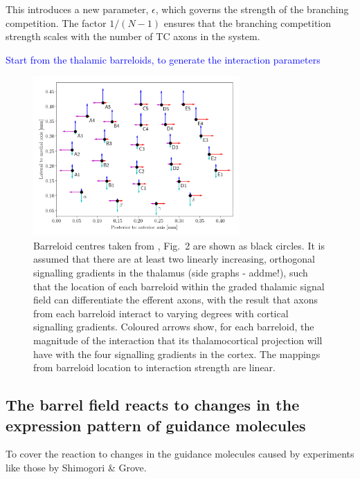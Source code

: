 \documentclass[a4paper,11pt]{article}
\newcommand{\cmnt}[1]{\textcolor{blue}{#1}}
\begin{document}
This introduces a new parameter, $\epsilon$, which governs the
strength of the branching competition. The factor $1/(N-1)$ ensures that the
branching competition strength scales with the number of TC axons in the
system.

\cmnt{Start from the thalamic barreloids, to generate the interaction
  parameters}

\begin{figure}
\begin{center}
\includegraphics[width=0.7\textwidth]{../boundaries/barreloids_vanderloos_graph.png}
\end{center}
\caption{Barreloid centres taken from \cite{van_der_loos_1976}, Fig.~2
  are shown as black circles. It is assumed that there are at least
  two linearly increasing, orthogonal signalling gradients in the
  thalamus (side graphs - addme!), such that the location of each
  barreloid within the graded thalamic signal field can differentiate
  the efferent axons, with the result that axons from each barreloid
  interact to varying degrees with cortical signalling
  gradients. Coloured arrows show, for each barreloid, the magnitude
  of the interaction that its thalamocortical projection will have
  with the four signalling gradients in the cortex. The mappings from
  barreloid location to interaction strength are linear.}
\label{fig:barreloids}
\end{figure}

\subsection*{The barrel field reacts to changes in the expression pattern of guidance molecules}

To cover the reaction to changes in the guidance molecules caused by
experiments like those by Shimogori \& Grove.
\end{document}
